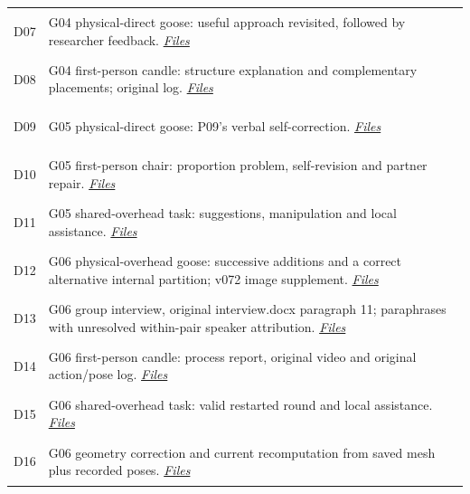 \begin{longtable}{@{}p{14mm}>{\raggedright\arraybackslash}p{140mm}@{}}
\hypertarget{src:D07}{}\label{src:D07}D07 & G04 physical-direct goose: useful approach revisited, followed by researcher feedback. \href{https://github.com/YiyangQin-UQ/REIT7841/blob/main/thesis/v1.1/materials/README.md\#d07}{\textit{Files}} \\
\hypertarget{src:D08}{}\label{src:D08}D08 & G04 first-person candle: structure explanation and complementary placements; original log. \href{https://github.com/YiyangQin-UQ/REIT7841/blob/main/thesis/v1.1/materials/README.md\#d08}{\textit{Files}} \\
\hypertarget{src:D09}{}\label{src:D09}D09 & G05 physical-direct goose: P09's verbal self-correction. \href{https://github.com/YiyangQin-UQ/REIT7841/blob/main/thesis/v1.1/materials/README.md\#d09}{\textit{Files}} \\
\hypertarget{src:D10}{}\label{src:D10}D10 & G05 first-person chair: proportion problem, self-revision and partner repair. \href{https://github.com/YiyangQin-UQ/REIT7841/blob/main/thesis/v1.1/materials/README.md\#d10}{\textit{Files}} \\
\hypertarget{src:D11}{}\label{src:D11}D11 & G05 shared-overhead task: suggestions, manipulation and local assistance. \href{https://github.com/YiyangQin-UQ/REIT7841/blob/main/thesis/v1.1/materials/README.md\#d11}{\textit{Files}} \\
\hypertarget{src:D12}{}\label{src:D12}D12 & G06 physical-overhead goose: successive additions and a correct alternative internal partition; v072 image supplement. \href{https://github.com/YiyangQin-UQ/REIT7841/blob/main/thesis/v1.1/materials/README.md\#d12}{\textit{Files}} \\
\hypertarget{src:D13}{}\label{src:D13}D13 & G06 group interview, original interview.docx paragraph 11; paraphrases with unresolved within-pair speaker attribution. \href{https://github.com/YiyangQin-UQ/REIT7841/blob/main/thesis/v1.1/materials/README.md\#d13}{\textit{Files}} \\
\hypertarget{src:D14}{}\label{src:D14}D14 & G06 first-person candle: process report, original video and original action/pose log. \href{https://github.com/YiyangQin-UQ/REIT7841/blob/main/thesis/v1.1/materials/README.md\#d14}{\textit{Files}} \\
\hypertarget{src:D15}{}\label{src:D15}D15 & G06 shared-overhead task: valid restarted round and local assistance. \href{https://github.com/YiyangQin-UQ/REIT7841/blob/main/thesis/v1.1/materials/README.md\#d15}{\textit{Files}} \\
\hypertarget{src:D16}{}\label{src:D16}D16 & G06 geometry correction and current recomputation from saved mesh plus recorded poses. \href{https://github.com/YiyangQin-UQ/REIT7841/blob/main/thesis/v1.1/materials/README.md\#d16}{\textit{Files}} \\

\end{longtable}
